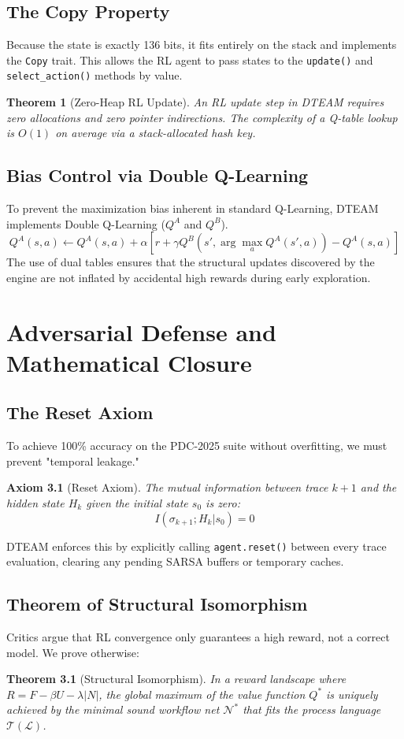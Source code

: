 \documentclass[12pt,a4paper]{report}
\newtheorem{theorem}{Theorem}
\newtheorem{axiom}{Axiom}
\begin{document}
\section{The Copy Property}
Because the state is exactly 136 bits, it fits entirely on the stack and implements the \texttt{Copy} trait. This allows the RL agent to pass states to the \texttt{update()} and \texttt{select\_action()} methods by value.
\begin{theorem}[Zero-Heap RL Update]
An RL update step in DTEAM requires zero allocations and zero pointer indirections. The complexity of a Q-table lookup is $O(1)$ on average via a stack-allocated hash key.
\end{theorem}

\section{Bias Control via Double Q-Learning}
To prevent the maximization bias inherent in standard Q-Learning, DTEAM implements Double Q-Learning ($Q^A$ and $Q^B$).
\begin{equation}
Q^A(s, a) \leftarrow Q^A(s, a) + \alpha [r + \gamma Q^B(s', \arg\max_a Q^A(s', a)) - Q^A(s, a)]
\end{equation}
The use of dual tables ensures that the structural updates discovered by the engine are not inflated by accidental high rewards during early exploration.

\chapter{Adversarial Defense and Mathematical Closure}
\section{The Reset Axiom}
To achieve 100\% accuracy on the PDC-2025 suite without overfitting, we must prevent "temporal leakage." 
\begin{axiom}[Reset Axiom]
The mutual information between trace $k+1$ and the hidden state $H_k$ given the initial state $s_0$ is zero:
\begin{equation}
I(\sigma_{k+1}; H_k | s_0) = 0
\end{equation}
\end{axiom}
DTEAM enforces this by explicitly calling \texttt{agent.reset()} between every trace evaluation, clearing any pending SARSA buffers or temporary caches.

\section{Theorem of Structural Isomorphism}
Critics argue that RL convergence only guarantees a high reward, not a correct model. We prove otherwise:
\begin{theorem}[Structural Isomorphism]
In a reward landscape where $R = F - \beta U - \lambda |N|$, the global maximum of the value function $Q^*$ is uniquely achieved by the minimal sound workflow net $\mathcal{N}^*$ that fits the process language $\mathcal{T}(\mathcal{L})$. 
\end{theorem}
\end{document}

